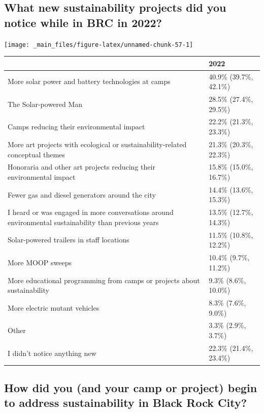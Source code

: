 \documentclass[
]{book}
\begin{document}
\hypertarget{what-new-sustainability-projects-did-you-notice-while-in-brc-in-2022}{%
\subsection{What new sustainability projects did you notice while in BRC in 2022?}\label{what-new-sustainability-projects-did-you-notice-while-in-brc-in-2022}}

\texttt{[image: \_main\_files/figure-latex/unnamed-chunk-57-1]}

\begin{table}
\centering
\begin{tabular}[t]{>{}l|>{}l}
\hline
  & 2022\\
\hline
More solar power and battery 
 technologies at camps & 40.9\% (39.7\%, 42.1\%)\\
\hline
The Solar-powered Man & 28.5\% (27.4\%, 29.5\%)\\
\hline
Camps reducing their 
 environmental impact & 22.2\% (21.3\%, 23.3\%)\\
\hline
More art projects with 
 ecological or sustainability-related 
 conceptual themes & 21.3\% (20.3\%, 22.3\%)\\
\hline
Honoraria and other 
 art projects reducing 
 their environmental impact & 15.8\% (15.0\%, 16.7\%)\\
\hline
Fewer gas and diesel generators 
 around the city & 14.4\% (13.6\%, 15.3\%)\\
\hline
I heard or was engaged in more 
 conversations around environmental sustainability 
 than previous years & 13.5\% (12.7\%, 14.3\%)\\
\hline
Solar-powered trailers 
 in staff locations & 11.5\% (10.8\%, 12.2\%)\\
\hline
More MOOP sweeps & 10.4\% (9.7\%, 11.2\%)\\
\hline
More educational programming 
 from camps or projects 
 about sustainability & 9.3\% (8.6\%, 10.0\%)\\
\hline
More electric mutant vehicles & 8.3\% (7.6\%, 9.0\%)\\
\hline
Other & 3.3\% (2.9\%, 3.7\%)\\
\hline
I didn't notice anything new & 22.3\% (21.4\%, 23.4\%)\\
\hline
\end{tabular}
\end{table}

\hypertarget{how-did-you-and-your-camp-or-project-begin-to-address-sustainability-in-black-rock-city}{%
\subsection{How did you (and your camp or project) begin to address sustainability in Black Rock City?}\label{how-did-you-and-your-camp-or-project-begin-to-address-sustainability-in-black-rock-city}}
\end{document}
